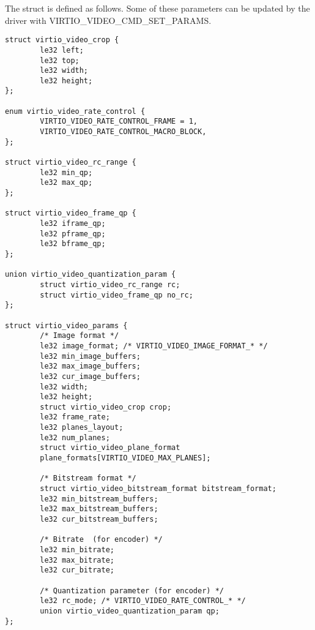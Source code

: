 \begin{description}
The struct  is defined as follows. Some of these
parameters can be updated by the driver with VIRTIO_VIDEO_CMD_SET_PARAMS.
\begin{lstlisting}
struct virtio_video_crop {
        le32 left;
        le32 top;
        le32 width;
        le32 height;
};

enum virtio_video_rate_control {
        VIRTIO_VIDEO_RATE_CONTROL_FRAME = 1,
        VIRTIO_VIDEO_RATE_CONTROL_MACRO_BLOCK,
};

struct virtio_video_rc_range {
        le32 min_qp;
        le32 max_qp;
};

struct virtio_video_frame_qp {
        le32 iframe_qp;
        le32 pframe_qp;
        le32 bframe_qp;
};

union virtio_video_quantization_param {
        struct virtio_video_rc_range rc;
        struct virtio_video_frame_qp no_rc;
};

struct virtio_video_params {
        /* Image format */
        le32 image_format; /* VIRTIO_VIDEO_IMAGE_FORMAT_* */
        le32 min_image_buffers;
        le32 max_image_buffers;
        le32 cur_image_buffers;
        le32 width;
        le32 height;
        struct virtio_video_crop crop;
        le32 frame_rate;
        le32 planes_layout;
        le32 num_planes;
        struct virtio_video_plane_format
        plane_formats[VIRTIO_VIDEO_MAX_PLANES];

        /* Bitstream format */
        struct virtio_video_bitstream_format bitstream_format;
        le32 min_bitstream_buffers;
        le32 max_bitstream_buffers;
        le32 cur_bitstream_buffers;

        /* Bitrate  (for encoder) */
        le32 min_bitrate;
        le32 max_bitrate;
        le32 cur_bitrate;

        /* Quantization parameter (for encoder) */
        le32 rc_mode; /* VIRTIO_VIDEO_RATE_CONTROL_* */
        union virtio_video_quantization_param qp;
};
\end{lstlisting}


\end{description}
